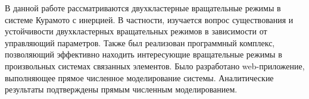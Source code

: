 В данной работе рассматриваются двухкластерные вращательные режимы в системе Курамото с инерцией. 
В частности, изучается вопрос существования и устойчивости двухкластерных вращательных режимов в зависимости от управляющий параметров.
Также был реализован программный комплекс, позволяющий эффективно находить интересующие вращательные
режимы в произвольных системах связанных элементов.
Было разработано web-приложение, выполняющее прямое численное моделирование системы.
Аналитические результаты подтверждены прямым численным моделированием.
